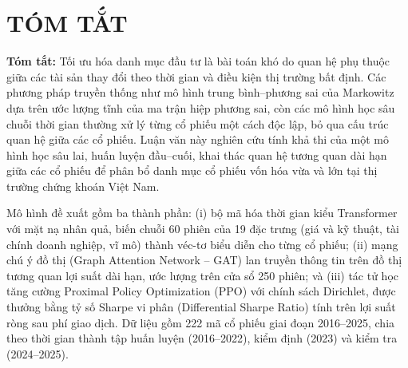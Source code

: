 \chapter*{TÓM TẮT}
{\small{}
\noindent\textbf{Tóm tắt:} Tối ưu hóa danh mục đầu tư là bài toán khó do quan hệ phụ thuộc giữa các tài sản thay đổi theo thời gian và điều kiện thị trường bất định. Các phương pháp truyền thống như mô hình trung bình--phương sai của Markowitz dựa trên ước lượng tĩnh của ma trận hiệp phương sai, còn các mô hình học sâu chuỗi thời gian thường xử lý từng cổ phiếu một cách độc lập, bỏ qua cấu trúc quan hệ giữa các cổ phiếu. Luận văn này nghiên cứu tính khả thi của một mô hình học sâu lai, huấn luyện đầu--cuối, khai thác quan hệ tương quan dài hạn giữa các cổ phiếu để phân bổ danh mục cổ phiếu vốn hóa vừa và lớn tại thị trường chứng khoán Việt Nam.

Mô hình đề xuất gồm ba thành phần: (i) bộ mã hóa thời gian kiểu Transformer với mặt nạ nhân quả, biến chuỗi 60 phiên của 19 đặc trưng (giá và kỹ thuật, tài chính doanh nghiệp, vĩ mô) thành véc-tơ biểu diễn cho từng cổ phiếu; (ii) mạng chú ý đồ thị (Graph Attention Network -- GAT) lan truyền thông tin trên đồ thị tương quan lợi suất dài hạn, ước lượng trên cửa sổ 250 phiên; và (iii) tác tử học tăng cường Proximal Policy Optimization (PPO) với chính sách Dirichlet, được thưởng bằng tỷ số Sharpe vi phân (Differential Sharpe Ratio) tính trên lợi suất ròng sau phí giao dịch. Dữ liệu gồm 222 mã cổ phiếu giai đoạn 2016--2025, chia theo thời gian thành tập huấn luyện (2016--2022), kiểm định (2023) và kiểm tra (2024--2025).

}
